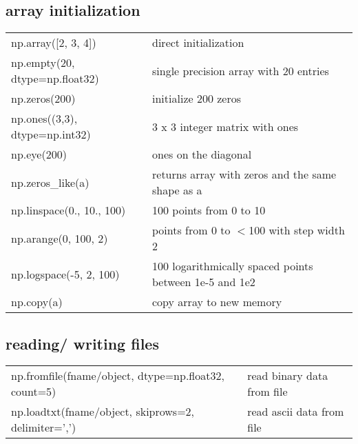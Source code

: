 \documentclass[10pt, a4paper, twocolumn]{article}
\begin{document}
\subsection*{array initialization}
\begin{tabular}{ p{} p{} }
  np.array([2, 3, 4]) & direct initialization\\
  np.empty(20, dtype=np.float32) & single precision array with 20 entries\\
  np.zeros(200) & initialize 200 zeros\\
  np.ones((3,3), dtype=np.int32) & 3 x 3 integer matrix with ones\\
  np.eye(200) & ones on the diagonal\\
  np.zeros\_like(a) & returns array with zeros and the same shape as a\\
  np.linspace(0., 10., 100) & 100 points from 0 to 10\\
  np.arange(0, 100, 2) & points from 0 to $<$100 with step width 2\\
  np.logspace(-5, 2, 100) & 100 logarithmically spaced points between 1e-5 and 1e2\\
  np.copy(a) & copy array to new memory\\
\end{tabular}

\subsection*{reading/ writing files}
\begin{tabular}{ p{} p{} }
  np.fromfile(fname/object, dtype=np.float32, count=5) & read binary data from file\\
  np.loadtxt(fname/object, skiprows=2, delimiter=',') & read ascii data from file
\end{tabular}
\end{document}
